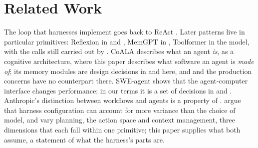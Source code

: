 \section{Related Work}
\label{sec:related}
The loop that harnesses implement goes back to ReAct \cite{yao2023react}. Later patterns live in particular primitives: Reflexion \cite{shinn2023reflexion} in  and , MemGPT \cite{packer2023memgpt} in , Toolformer \cite{schick2023toolformer} in the model, with the calls still carried out by . CoALA \cite{sumers2024coala} describes what an agent \emph{is}, as a cognitive architecture, where this paper describes what software an agent is \emph{made of}; its memory modules are design decisions in  and  here, and  and the production concerns have no counterpart there. SWE-agent \cite{yang2024sweagent} shows that the agent-computer interface changes performance; in our terms it is a set of decisions in  and . Anthropic's distinction between workflows and agents \cite{anthropic2024effective} is a property of . \cite{zhang2026stop} argue that harness configuration can account for more variance than the choice of model, and \cite{fan2026empirical} vary planning, the action space and context management, three dimensions that each fall within one primitive; this paper supplies what both assume, a statement of what the harness's parts are.

